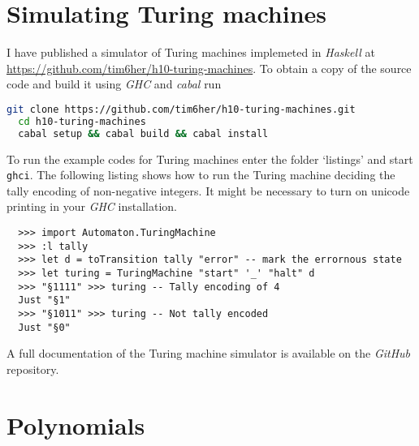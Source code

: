 % 

\section{Simulating Turing machines}%
\label{app:turing}%

I have published a simulator of Turing machines implemeted in \emph{Haskell}
at \url{https://github.com/tim6her/h10-turing-machines}. To obtain a copy of
the source code and build it using \emph{GHC} and \emph{cabal} run

\begin{lstlisting}[language=bash]
  git clone https://github.com/tim6her/h10-turing-machines.git
  cd h10-turing-machines
  cabal setup && cabal build && cabal install
\end{lstlisting}

To run the example codes for Turing machines enter the folder ‘listings’ and
start \verb+ghci+. The following listing shows how to run the Turing machine
deciding the tally encoding of non-negative integers. It might be necessary to
turn on unicode printing in your \emph{GHC} installation.

\begin{lstlisting}
  >>> import Automaton.TuringMachine
  >>> :l tally
  >>> let d = toTransition tally "error" -- mark the errornous state
  >>> let turing = TuringMachine "start" '_' "halt" d
  >>> "§1111" >>> turing -- Tally encoding of 4
  Just "§1"
  >>> "§1011" >>> turing -- Not tally encoded
  Just "§0"
\end{lstlisting}

A full documentation of the Turing machine simulator is available on the
\emph{GitHub} repository.

\section{Polynomials}\label{app:polynomials}

